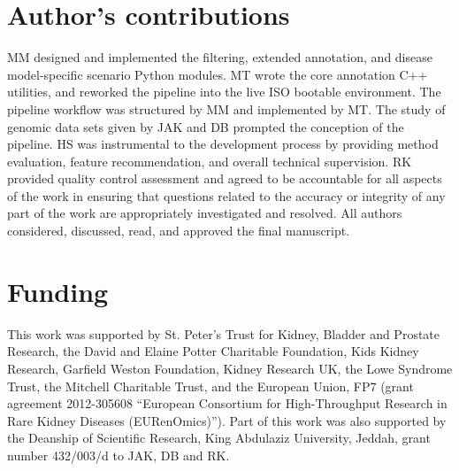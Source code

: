 \documentclass[twocolumn]{bmcart}%
\begin{document}
\begin{backmatter}
\section*{Author's contributions}
MM designed and implemented the filtering, extended annotation, and disease model-specific scenario Python modules. MT wrote the core annotation C++ utilities, and reworked the pipeline into the live ISO bootable environment. The pipeline workflow was structured by MM and implemented by MT. The study of genomic data sets given by JAK and DB prompted the conception of the pipeline. HS was instrumental to the development process by providing method evaluation, feature recommendation, and overall technical supervision. RK provided quality control assessment and agreed to be accountable for all aspects of the work in ensuring that questions related to the accuracy or integrity of any part of the work are appropriately investigated and resolved. All authors considered, discussed, read, and approved the final manuscript.



\section*{Funding}
This work was supported by St. Peter's Trust for Kidney, Bladder and Prostate Research, the David and Elaine Potter Charitable Foundation, Kids Kidney Research, Garfield Weston Foundation, Kidney Research UK, the Lowe Syndrome Trust, the Mitchell Charitable Trust, and the European Union, FP7 (grant agreement 2012-305608 ``European Consortium for High-Throughput Research in Rare Kidney Diseases (EURenOmics)''). Part of this work was also supported by the Deanship of Scientific Research, King Abdulaziz University, Jeddah, grant number 432/003/d to JAK, DB and RK.




\end{backmatter}
\end{document}
